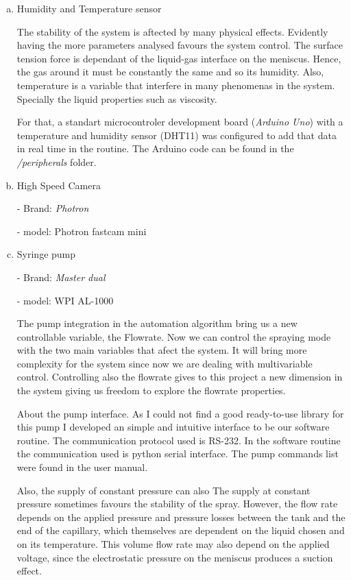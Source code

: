 \begin{enumerate}[a)]
  \item Humidity and Temperature sensor
  
  The stability of the system is aftected by many physical effects. Evidently having the more parameters analysed favours the system control.
  The surface tension force is dependant of the liquid-gas interface on the meniscus. Hence, the gas around it must be constantly the same and so its humidity.
  Also, temperature is a variable that interfere in many phenomenas in the system. Specially the liquid properties such as viscosity.

  For that, a standart microcontroler development board (\emph{Arduino Uno}) with a temperature and humidity sensor (DHT11) was configured to add that data in real time in the routine.
  The Arduino code can be found in the \emph{/peripherals} folder.
  

  \item High Speed Camera 
  
  - Brand: \emph{Photron}

  - model: Photron fastcam mini


  
  \item Syringe pump
  
  - Brand: \emph{Master dual}

  - model: WPI AL-1000

  The pump integration in the automation algorithm bring us a new controllable variable, the Flowrate. Now we can control the spraying mode with the
    two main variables that afect the system. 
    It will bring more complexity for the system since now we are dealing with multivariable control.
    Controlling also the flowrate gives to this project a new dimension in the system giving us freedom to explore the flowrate properties.

    About the pump interface. As I could not find a good ready-to-use library for this pump I developed an simple and intuitive interface to be our software routine.
    The communication protocol used is RS-232. In the software routine the communication used is python serial interface. The pump commands list were found in the user manual.

  
  Also, the supply of constant pressure can also 
    \cite{prunet}
  The supply at constant pressure sometimes favours the stability of the spray. However, the flow rate depends on the applied pressure and pressure losses between the tank and the end of the capillary, which themselves are dependent on the liquid chosen and on its temperature. This volume flow rate may also depend on the applied voltage, since the electrostatic pressure on the meniscus produces a suction effect.


  \end{enumerate}



